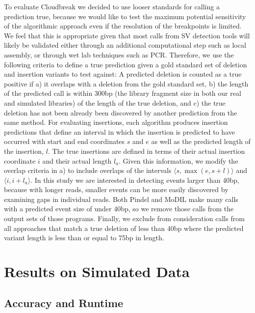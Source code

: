 To evaluate Cloudbreak we decided to use looser standards for calling a prediction true, because we would like to test the maximum potential sensitivity of the algorithmic approach even if the resolution of the breakpoints is limited. We feel that this is appropriate given that most calls from SV detection tools will likely be validated either through an additional computational step such as local assembly, or through wet lab techniques such as PCR. Therefore, we use the following criteria to define a true prediction given a gold standard set of deletion and insertion variants to test against: A predicted deletion is counted as a true positive if a) it overlaps with a deletion from the gold standard set, b) the length of the predicted call is within 300bp (the library fragment size in both our real and simulated libraries) of the length of the true deletion, and c) the true deletion has not been already been discovered by another prediction from the same method. For evaluating insertions, each algorithm produces insertion predictions that define an interval in which the insertion is predicted to have occurred with start and end coordinates $s$ and $e$ as well as the predicted length of the insertion, $l$. The true insertions are defined in terms of their actual insertion coordinate $i$ and their actual length $l_a$. Given this information, we modify the overlap criteria in a) to include overlaps of the intervals $\langle s,\max{\left(e,s+l\right)} \rangle$ and $\langle i,i+l_a \rangle$. In this study we are interested in detecting events larger than 40bp, because with longer reads, smaller events can be more easily discovered by examining gaps in individual reads. Both Pindel and MoDIL make many calls with a predicted event size of under 40bp, so we remove those calls from the output sets of those programs. Finally, we exclude from consideration calls from all approaches that match a true deletion of less than 40bp where the predicted variant length is less than or equal to 75bp in length.

\section{Results on Simulated Data}

\subsection{Accuracy and Runtime}

